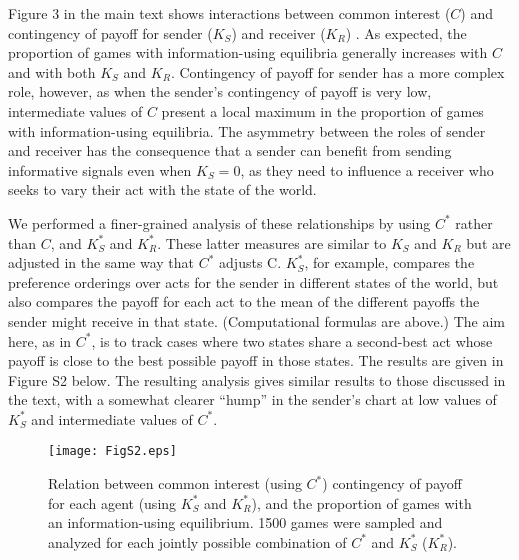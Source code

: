 \documentclass{article}
\begin{document}
Figure 3 in the main text shows interactions between common
interest ($C$) and contingency of payoff for sender ($K_S$) and receiver
($K_R$) . As expected, the proportion of games with information-using
equilibria generally increases with $C$ and with both $K_S$ and $K_R$.
Contingency of payoff for sender has a more complex role, however,
as when the sender's contingency of payoff is very low, intermediate
values of $C$ present a local maximum in the proportion of games with
 information-using equilibria. The asymmetry between the roles of
sender and receiver has the consequence that a sender can benefit
from sending informative signals even when $K_S=0$, as they need to
influence a receiver who seeks to vary their act with the state of the
world.

We performed a finer-grained analysis of these relationships by
using $C^*$ rather than $C$, and $K^*_S$ and $K^*_R$. These latter measures are
similar to $K_S$ and $K_R$ but are adjusted in the same way that $C^*$ adjusts
C. $K^*_S$, for example, compares the preference orderings over acts for
the sender in different states of the world, but also compares the
payoff for each act to the mean of the different payoffs the sender might receive in that
state. (Computational formulas are above.) The aim here, as in $C^*$, is
to track cases where two states share a second-best act whose payoff
is close to the best possible payoff in those states. The results are
given in Figure S2 below. The resulting analysis gives similar results to
those discussed in the text, with a somewhat clearer ``hump'' in the
sender's chart at low values of $K^*_S$ and intermediate values of $C^*$.

\begin{figure}[!ht]
\begin{center}
    \texttt{[image: FigS2.eps]}
\end{center}
\caption
    {Relation between common interest (using $C^*$)
contingency of payoff for each agent (using $K^*_S$ and
$K^*_R$), and the proportion of games with
an information-using equilibrium. 1500 games were sampled and analyzed for each
jointly possible combination of $C^*$ and $K^*_S$ ($K^*_R$).}
\label{Figure_label}
\end{figure}




\end{document}
